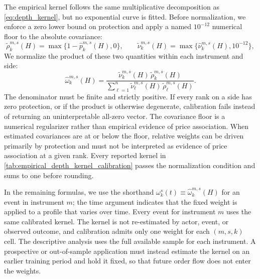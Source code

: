 \documentclass[11pt]{article}
\newenvironment{review}{\begingroup\color{blue}}{\endgroup}
\begin{document}
The empirical kernel follows the same multiplicative decomposition as \cref{eq:depth_kernel}, but no exponential curve is
fitted. Before normalization, we enforce a zero lower bound on protection and apply a named $10^{-12}$ numerical floor to
the absolute covariance:
\begin{equation}
    \widetilde\rho^{m,s}_{k}(H)=\max\{1-\widehat p^{m,s}_{k}(H),0\},
    \qquad
    \widetilde\nu^{m,s}_{k}(H)=\max\{\widehat\nu^{m,s}_{k}(H),10^{-12}\},
    \label{eq:empirical_kernel_floors}
\end{equation}
We normalize the product of these two quantities within each instrument and side:
\begin{equation}
    \widehat\omega^{m,s}_{k}(H)
    =
    \frac{
        \widetilde\nu^{m,s}_{k}(H)\,\widetilde\rho^{m,s}_{k}(H)
    }{
        \sum_{\ell=1}^{n}\widetilde\nu^{m,s}_{\ell}(H)\,\widetilde\rho^{m,s}_{\ell}(H)
    }.
    \label{eq:empirical_depth_kernel}
\end{equation}
The denominator must be finite and strictly positive. If every rank on a side has zero protection, or if the product is
otherwise degenerate, calibration fails instead of returning an uninterpretable all-zero vector. The covariance floor is a
numerical regularizer rather than empirical evidence of price association. When estimated covariances are at or below the
floor, relative weights can be driven primarily by protection and must not be interpreted as evidence of \begin{review}price association at a given rank\end{review}. Every reported kernel in \cref{tab:empirical_depth_kernel_calibration} passes the normalization condition and
sums to one before rounding.

In the remaining formulas, we use the shorthand
$\omega^{s}_{k}(t)\equiv\widehat\omega^{m,s}_{k}(H)$ for an event in instrument $m$; the time argument indicates that the
fixed weight is applied to \begin{review}a profile that varies over time\end{review}. Every event for instrument $m$ uses the same calibrated kernel. The kernel is not
re-estimated by actor, event, or observed outcome, and calibration admits only one weight for each $(m,s,k)$ cell. The
descriptive analysis uses the full available sample for each instrument. A prospective or out-of-sample application must
instead estimate the kernel on an earlier training period and hold it fixed, so that future order flow does not enter the
weights.
\end{document}
